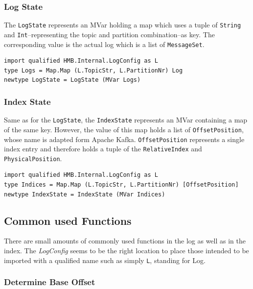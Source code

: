 \newpage
\subsubsection{Log State}

The \lstinline{LogState} represents an MVar holding a map which uses a tuple of
\lstinline{String} and \lstinline{Int}--representing the topic and partition
 combination--as key. The corresponding value is the actual log which is a list
of \lstinline{MessageSet}.

\begin{lstlisting}[caption={Definition of log state (MVar)}]
import qualified HMB.Internal.LogConfig as L
type Logs = Map.Map (L.TopicStr, L.PartitionNr) Log
newtype LogState = LogState (MVar Logs)
\end{lstlisting}

\subsubsection{Index State}

Same as for the \lstinline{LogState}, the \lstinline{IndexState} represents an
MVar containing a map of the same key. However, the value
of this map holds a list of \lstinline{OffsetPosition}, whose name is
adapted form Apache Kafka. \lstinline{OffsetPosition} represents a single index
entry and therefore holds a tuple of the \lstinline{RelativeIndex} and
\lstinline{PhysicalPosition}. 

\begin{lstlisting}[caption={Definition of index state (MVar)}]
import qualified HMB.Internal.LogConfig as L
type Indices = Map.Map (L.TopicStr, L.PartitionNr) [OffsetPosition]
newtype IndexState = IndexState (MVar Indices)
\end{lstlisting}

\subsection{Common used Functions}

There are small amounts of commonly used functions in the log as well as in the
index. The \textit{LogConfig} seems to be the right location to place those
intended to be imported with a qualified name such as simply \lstinline{L},
standing for Log.

\subsubsection{Determine Base Offset}
\label{subsubsec:broker-log-general-baseoffset}

